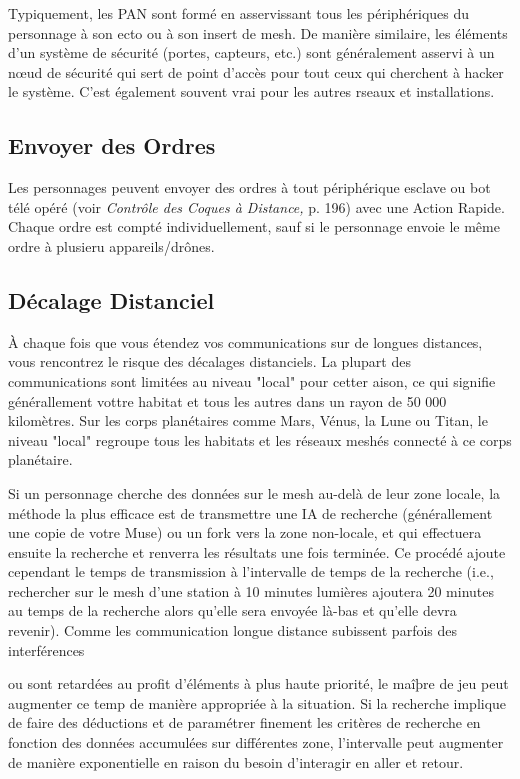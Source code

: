 Typiquement, les PAN sont formé en asservissant tous les périphériques du personnage à son ecto ou à son insert de mesh. De manière similaire, les éléments d'un système de sécurité (portes, capteurs, etc.) sont généralement asservi à un nœud de sécurité qui sert de point d'accès pour tout ceux qui cherchent à hacker le système. C'est également souvent vrai pour les autres rseaux et installations. 

\subsection{Envoyer des Ordres} 

Les personnages peuvent envoyer des ordres à tout périphérique esclave ou bot télé opéré (voir \textit{Contrôle des Coques à Distance,} p. 196) avec une Action Rapide. Chaque ordre est compté individuellement, sauf si le personnage envoie le même ordre à plusieru appareils/drônes. 

\subsection{Décalage Distanciel} 

À chaque fois que vous étendez vos communications sur de longues distances, vous rencontrez le risque des décalages distanciels. La plupart des communications sont limitées au niveau "local" pour cetter aison, ce qui signifie générallement vottre habitat et tous les autres dans un rayon de 50 000 kilomètres. Sur les corps planétaires comme Mars, Vénus, la Lune ou Titan, le niveau "local" regroupe tous les habitats et les réseaux meshés connecté à ce corps planétaire. 

Si un personnage cherche des données sur le mesh au-delà de leur zone locale, la méthode la plus efficace est de transmettre une IA de recherche (générallement une copie de votre Muse) ou un fork vers la zone non-locale, et qui effectuera ensuite la recherche et renverra les résultats une fois terminée. Ce procédé ajoute cependant le temps de transmission à l'intervalle de temps de la recherche (i.e., rechercher sur le mesh d'une station à 10 minutes lumières ajoutera 20 minutes au temps de la recherche alors qu'elle sera envoyée là-bas et qu'elle devra revenir). Comme les communication longue distance subissent parfois des interférences 

ou sont retardées au profit d'éléments à plus haute priorité, le maîþre de jeu peut augmenter ce temp de manière appropriée à la situation. Si la recherche implique de faire des déductions et de paramétrer finement les critères de recherche en fonction des données accumulées sur différentes zone, l'intervalle peut augmenter de manière exponentielle en raison du besoin d'interagir en aller et retour. 

